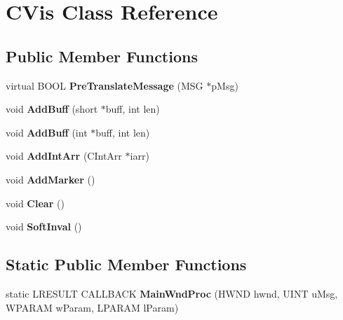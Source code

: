 \hypertarget{class_c_vis}{\section{C\-Vis Class Reference}
\label{class_c_vis}
}
\subsection*{Public Member Functions}
\begin{DoxyCompactItemize}
\item 
\hypertarget{class_c_vis_a4f884042a734a41b82e259ff46863445}{virtual B\-O\-O\-L {\bfseries Pre\-Translate\-Message} (M\-S\-G $\ast$p\-Msg)}\label{class_c_vis_a4f884042a734a41b82e259ff46863445}

\item 
\hypertarget{class_c_vis_aea61a760235ca47ce968fa504c75011b}{void {\bfseries Add\-Buff} (short $\ast$buff, int len)}\label{class_c_vis_aea61a760235ca47ce968fa504c75011b}

\item 
\hypertarget{class_c_vis_aebbefea3694a93790c59f3ecc892a29a}{void {\bfseries Add\-Buff} (int $\ast$buff, int len)}\label{class_c_vis_aebbefea3694a93790c59f3ecc892a29a}

\item 
\hypertarget{class_c_vis_aeb5ca639062945f083d7d13ab456e328}{void {\bfseries Add\-Int\-Arr} (C\-Int\-Arr $\ast$iarr)}\label{class_c_vis_aeb5ca639062945f083d7d13ab456e328}

\item 
\hypertarget{class_c_vis_afda957e260e5278d6b6e356feb283663}{void {\bfseries Add\-Marker} ()}\label{class_c_vis_afda957e260e5278d6b6e356feb283663}

\item 
\hypertarget{class_c_vis_ac8466c8f234ae44da88a571d89881fb1}{void {\bfseries Clear} ()}\label{class_c_vis_ac8466c8f234ae44da88a571d89881fb1}

\item 
\hypertarget{class_c_vis_a8a7c1519bbc3f7026a705f2e83162022}{void {\bfseries Soft\-Inval} ()}\label{class_c_vis_a8a7c1519bbc3f7026a705f2e83162022}

\end{DoxyCompactItemize}
\subsection*{Static Public Member Functions}
\begin{DoxyCompactItemize}
\item 
\hypertarget{class_c_vis_a15f6a17a5bd0d426a1d64fcb40488f6f}{static L\-R\-E\-S\-U\-L\-T C\-A\-L\-L\-B\-A\-C\-K {\bfseries Main\-Wnd\-Proc} (H\-W\-N\-D hwnd, U\-I\-N\-T u\-Msg, W\-P\-A\-R\-A\-M w\-Param, L\-P\-A\-R\-A\-M l\-Param)}\label{class_c_vis_a15f6a17a5bd0d426a1d64fcb40488f6f}

\end{DoxyCompactItemize}
